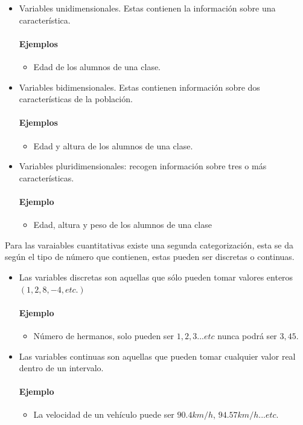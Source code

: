 \documentclass[12pt,hidelinks]{article}
\begin{document}
	\begin{itemize}
		\item Variables unidimensionales. Estas contienen la información sobre una característica.
		\paragraph{Ejemplos}
		\begin{itemize}
			\item Edad de los alumnos de una clase.
		\end{itemize}
		\item Variables bidimensionales. Estas contienen información sobre dos características de la población.
		\paragraph{Ejemplos}
		\begin{itemize}
			\item Edad y altura de los alumnos de una clase.
		\end{itemize}
		\item Variables pluridimensionales: recogen información sobre tres o más características.
		\paragraph{Ejemplo}
		\begin{itemize}
			\item Edad, altura y peso de los alumnos de una clase
		\end{itemize}
	\end{itemize}
	Para las varaiables cuantitativas existe una segunda categorización, esta se da según el tipo de número que contienen, estas pueden ser discretas o continuas.
	\begin{itemize}
		\item Las variables discretas son aquellas que sólo pueden tomar valores enteros $(1, 2, 8, -4, etc.)$
		\paragraph{Ejemplo}
		\begin{itemize}
			\item Número de hermanos, solo pueden ser $1, 2, 3 ... etc$ nunca podrá ser $3,45$.
		\end{itemize}
		\item Las variables continuas son aquellas que  pueden tomar cualquier valor real dentro de un intervalo.
		\paragraph{Ejemplo}
		\begin{itemize}
			\item La velocidad de un vehículo puede ser $90.4 km/h$, $94.57 km/h...etc$.
		\end{itemize}
	\end{itemize}
\end{document}
